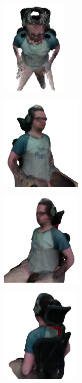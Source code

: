 \begin{figure}[h]
\begin{subfigure}[t]{0.2\textheight}
    \end{subfigure}
    \begin{subfigure}[t]{0.2\textheight}
    	\centering
        \includegraphics[height=4.5cm]{archivos/experimentacion-5-resultado-nube-5.png}
    \end{subfigure}
    \begin{subfigure}[t]{0.2\textheight}
    	\centering
        \includegraphics[height=4.5cm]{archivos/experimentacion-5-resultado-malla.png}
    \end{subfigure}
    \begin{subfigure}[t]{0.2\textheight}
    	\centering
        \includegraphics[height=4.5cm]{archivos/experimentacion-5-resultado-malla-2.png}
    \end{subfigure}
    \begin{subfigure}[t]{0.2\textheight}
    	\centering
        \includegraphics[height=4.5cm]{archivos/experimentacion-5-resultado-malla-3.png}

\end{subfigure}
\end{figure}
